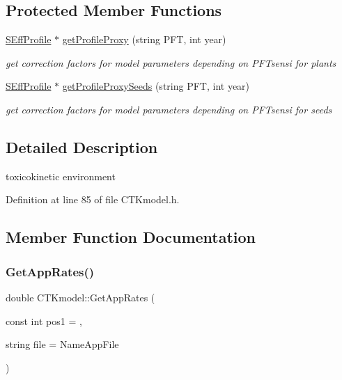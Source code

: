 \subsection*{Protected Member Functions}
\begin{DoxyCompactItemize}
\item 
\mbox{\hyperlink{struct_s_eff_profile}{S\+Eff\+Profile}} $\ast$ \mbox{\hyperlink{class_c_t_kmodel_a1840a4b16c95c07995f55e317c23497e}{get\+Profile\+Proxy}} (string P\+FT, int year)
\begin{DoxyCompactList}\small\item\em get correction factors for model parameters depending on P\+F\+Tsensi for plants \end{DoxyCompactList}\item 
\mbox{\hyperlink{struct_s_eff_profile}{S\+Eff\+Profile}} $\ast$ \mbox{\hyperlink{class_c_t_kmodel_a561adaf724a7bdf1f55b509aec457c96}{get\+Profile\+Proxy\+Seeds}} (string P\+FT, int year)
\begin{DoxyCompactList}\small\item\em get correction factors for model parameters depending on P\+F\+Tsensi for seeds \end{DoxyCompactList}\end{DoxyCompactItemize}


\subsection{Detailed Description}
toxicokinetic environment 

Definition at line 85 of file C\+T\+Kmodel.\+h.



\subsection{Member Function Documentation}
\mbox{\label{class_c_t_kmodel_a20c6e31e81095343abfc3b844c0b1645}} 
\subsubsection{\texorpdfstring{GetAppRates()}{GetAppRates()}}
{\footnotesize\ttfamily double C\+T\+Kmodel\+::\+Get\+App\+Rates (\begin{DoxyParamCaption}\item[{const int}]{pos1 = {},  }\item[{string}]{file = {\ttfamily NameAppFile} }\end{DoxyParamCaption})\hspace{0.3cm}{\ttfamily [static]}}



